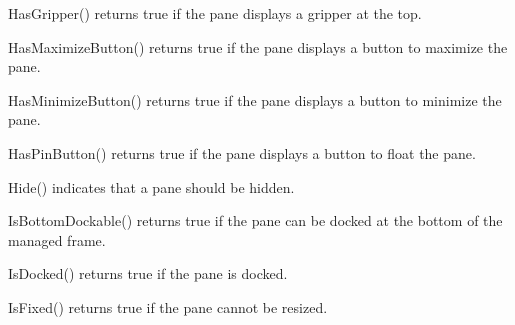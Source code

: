 \label{wxauipaneinfohasgrippertop}


HasGripper() returns true if the pane displays a gripper at the top.

\label{wxauipaneinfohasmaximizebutton}


HasMaximizeButton() returns true if the pane displays a button to maximize the pane.

\label{wxauipaneinfohasminimizebutton}


HasMinimizeButton() returns true if the pane displays a button to minimize the pane.

\label{wxauipaneinfohaspinbutton}


HasPinButton() returns true if the pane displays a button to float the pane.

\label{wxauipaneinfohide}


Hide() indicates that a pane should be hidden.

\label{wxauipaneinfoisbottomdockable}


IsBottomDockable() returns true if the pane can be docked at the bottom of the managed frame.

\label{wxauipaneinfoisdocked}


IsDocked() returns true if the pane is docked.

\label{wxauipaneinfoisfixed}


IsFixed() returns true if the pane cannot be resized.

\label{wxauipaneinfoisfloatable}


